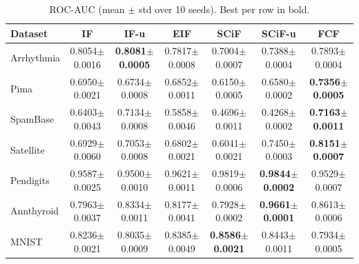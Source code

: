 \begin{table}[t]
\centering
\caption{ROC-AUC (mean $\pm$ std over 10 seeds). Best per row in bold.}
\label{tab:roc-results}
\scriptsize
\setlength{\tabcolsep}{4.5pt}
\renewcommand{\arraystretch}{1.15}
\begin{tabular}{lcccccc}
\toprule
Dataset & IF & IF-u & EIF & SCiF & SCiF-u & FCF \\
\midrule
Arrhythmia &
0.8054$\pm$0.0016 &
\textbf{0.8081$\pm$0.0005} &
0.7817$\pm$0.0008 &
0.7004$\pm$0.0007 &
0.7388$\pm$0.0004 &
0.7893$\pm$0.0004 \\
Pima &
0.6950$\pm$0.0021 &
0.6734$\pm$0.0008 &
0.6852$\pm$0.0011 &
0.6150$\pm$0.0005 &
0.6580$\pm$0.0002 &
\textbf{0.7356$\pm$0.0005} \\
SpamBase &
0.6403$\pm$0.0043 &
0.7134$\pm$0.0008 &
0.5858$\pm$0.0046 &
0.4696$\pm$0.0011 &
0.4268$\pm$0.0002 &
\textbf{0.7163$\pm$0.0011} \\
Satellite &
0.6929$\pm$0.0060 &
0.7053$\pm$0.0008 &
0.6802$\pm$0.0021 &
0.6041$\pm$0.0021 &
0.7450$\pm$0.0003 &
\textbf{0.8151$\pm$0.0007} \\
Pendigits &
0.9587$\pm$0.0025 &
0.9500$\pm$0.0010 &
0.9621$\pm$0.0011 &
0.9819$\pm$0.0006 &
\textbf{0.9844$\pm$0.0002} &
0.9529$\pm$0.0007 \\
Annthyroid &
0.7963$\pm$0.0037 &
0.8334$\pm$0.0011 &
0.8177$\pm$0.0041 &
0.7928$\pm$0.0002 &
\textbf{0.9661$\pm$0.0001} &
0.8613$\pm$0.0006 \\
MNIST &
0.8236$\pm$0.0021 &
0.8035$\pm$0.0009 &
0.8385$\pm$0.0049 &
\textbf{0.8586$\pm$0.0021} &
0.8443$\pm$0.0011 &
0.7934$\pm$0.0005 \\
\bottomrule
\end{tabular}
\end{table}

